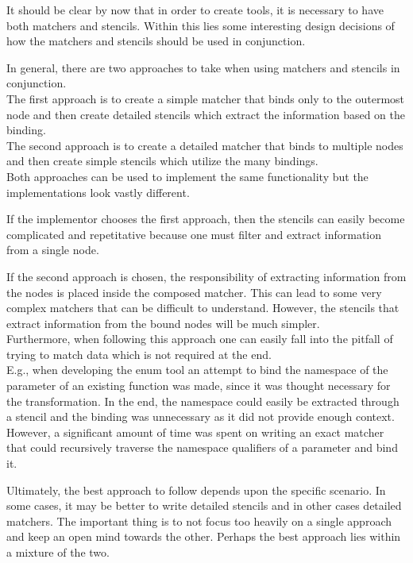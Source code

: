 It should be clear by now that in order to create tools, it is necessary to have both matchers and stencils. Within this lies some interesting design decisions of how the matchers and stencils should be used in conjunction.

In general, there are two approaches to take when using matchers and stencils in conjunction.\\
The first approach is to create a simple matcher that binds only to the outermost node and then create detailed stencils which extract the information based on the binding.\\
The second approach is to create a detailed matcher that binds to multiple nodes and then create simple stencils which utilize the many bindings.\\
Both approaches can be used to implement the same functionality but the implementations look vastly different.

If the implementor chooses the first approach, then the stencils can easily become complicated and repetitative because one must filter and extract information from a single node.

If the second approach is chosen, the responsibility of extracting information from the nodes is placed inside the composed matcher. This can lead to some very complex matchers that can be difficult to understand. However, the stencils that extract information from the bound nodes will be much simpler.\\
Furthermore, when following this approach one can easily fall into the pitfall of trying to match data which is not required at the end.\\
E.g., when developing the enum tool an attempt to bind the namespace of the parameter of an existing  function was made, since it was thought necessary for the transformation. In the end, the namespace could easily be extracted through a stencil and the binding was unnecessary as it did not provide enough context.
However, a significant amount of time was spent on writing an exact matcher that could recursively traverse the namespace qualifiers of a parameter and bind it.

Ultimately, the best approach to follow depends upon the specific scenario. In some cases, it may be better to write detailed stencils and in other cases detailed matchers. The important thing is to not focus too heavily on a single approach and keep an open mind towards the other. Perhaps the best approach lies within a mixture of the two.

